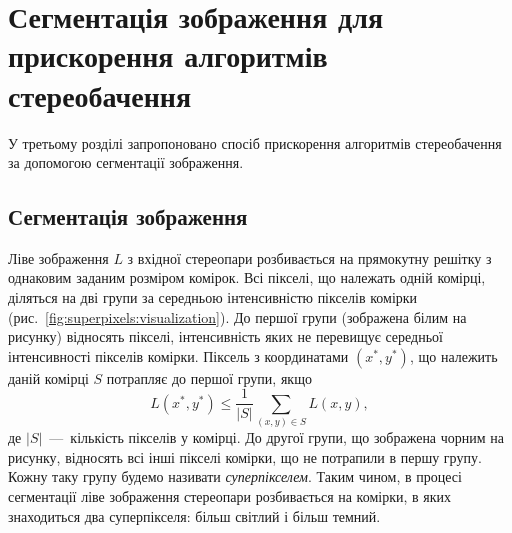 \chapter{Сегментація зображення для прискорення алгоритмів стереобачення}

У третьому розділі запропоновано спосіб прискорення алгоритмів стереобачення
за допомогою сегментації зображення.

\section{Сегментація зображення}

Ліве зображення $L$ з вхідної стереопари
розбивається на прямокутну решітку з однаковим заданим розміром комірок.
Всі пікселі, що належать одній комірці,
діляться на дві групи за середньою інтенсивністю пікселів комірки
(рис.~\ref{fig:superpixels:visualization}).
До першої групи (зображена білим на рисунку) відносять пікселі,
інтенсивність яких не перевищує середньої інтенсивності пікселів комірки.
Піксель з координатами $\left(x^*, y^* \right)$, що належить даній комірці $S$
потрапляє до першої групи, якщо
\begin{equation*}
    L \left(x^*, y^* \right) \le
        \frac{1}{ \left| S \right| }
        \sum \limits_{\left(x, y \right) \in S} L \left(x, y \right),
\end{equation*}
де $ \left| S \right|$~---~кількість пікселів у комірці.
До другої групи, що зображена чорним на рисунку,
відносять всі інші пікселі комірки, що не потрапили в першу групу.
Кожну таку групу будемо називати \textit{суперпікселем}.
Таким чином, в процесі сегментації ліве зображення
стереопари розбивається на комірки, в яких знаходиться два суперпікселя:
більш світлий і більш темний.

